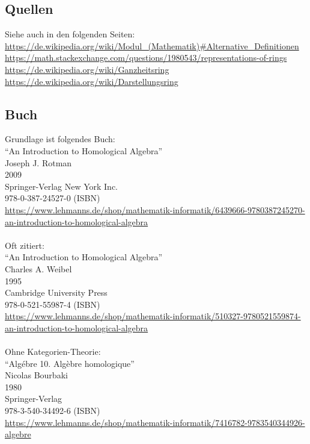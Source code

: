 \documentclass[a4paper]{amsart}
\theoremstyle{definition}
\begin{document}
\subsection*{Quellen}
Siehe auch in den folgenden Seiten:\\
\url{https://de.wikipedia.org/wiki/Modul_(Mathematik)#Alternative_Definitionen}\\
\url{https://math.stackexchange.com/questions/1980543/representations-of-rings}\\
\url{https://de.wikipedia.org/wiki/Ganzheitsring}\\
\url{https://de.wikipedia.org/wiki/Darstellungsring}

\subsection*{Buch}
Grundlage ist folgendes Buch:\\
"`An Introduction to Homological Algebra"'\\
Joseph J. Rotman\\
2009\\
Springer-Verlag New York Inc.\\
978-0-387-24527-0 (ISBN)\\
{\tiny
   \url{https://www.lehmanns.de/shop/mathematik-informatik/6439666-9780387245270-an-introduction-to-homological-algebra}}\\
\\
Oft zitiert:\\
"`An Introduction to Homological Algebra"'\\
Charles A. Weibel\\
1995\\
Cambridge University Press\\
978-0-521-55987-4 (ISBN)\\
{\tiny
   \url{https://www.lehmanns.de/shop/mathematik-informatik/510327-9780521559874-an-introduction-to-homological-algebra}}\\
\\
Ohne Kategorien-Theorie:\\
"`Algébre 10. Algèbre homologique"'\\
Nicolas Bourbaki\\
1980\\
Springer-Verlag \\
978-3-540-34492-6 (ISBN)\\
{\tiny
   \url{https://www.lehmanns.de/shop/mathematik-informatik/7416782-9783540344926-algebre}}
\end{document}
